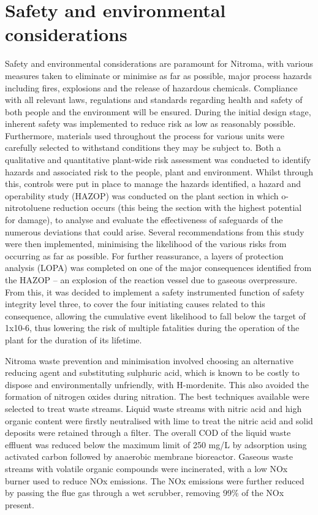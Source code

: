 \section*{Safety and environmental considerations}

Safety and environmental considerations are paramount for Nitroma, with various measures taken to eliminate or minimise as far as possible, major process hazards including fires, explosions and the release of hazardous chemicals. Compliance with all relevant laws, regulations and standards regarding health and safety of both people and the environment will be ensured.  During the initial design stage, inherent safety was implemented to reduce risk as low as reasonably possible. Furthermore, materials used throughout the process for various units were carefully selected to withstand conditions they may be subject to. Both a qualitative and quantitative plant-wide risk assessment was conducted to identify hazards and associated risk to the people, plant and environment. Whilst through this, controls were put in place to manage the hazards identified, a hazard and operability study (HAZOP) was conducted on the plant section in which o-nitrotoluene reduction occurs (this being the section with the highest potential for damage), to analyse and evaluate the effectiveness of safeguards of the numerous deviations that could arise. Several recommendations from this study were then implemented, minimising the likelihood of the various risks from occurring as far as possible. For further reassurance, a layers of protection analysis (LOPA) was completed on one of the major consequences identified from the HAZOP – an explosion of the reaction vessel due to gaseous overpressure.  From this, it was decided to implement a safety instrumented function of safety integrity level three, to cover the four initiating causes related to this consequence, allowing the cumulative event likelihood to fall below the target of 1x10-6, thus lowering the risk of multiple fatalities during the operation of the plant for the duration of its lifetime. 

Nitroma waste prevention and minimisation involved choosing an alternative reducing agent and substituting sulphuric acid, which is known to be costly to dispose and environmentally unfriendly, with H-mordenite. This also avoided the formation of nitrogen oxides during nitration. The best techniques available were selected to treat waste streams. Liquid waste streams with nitric acid and high organic content were firstly neutralised with lime to treat the nitric acid and solid deposits were retained through a filter. The overall COD of the liquid waste effluent was reduced below the maximum limit of 250 mg/L by adsorption using activated carbon followed by anaerobic membrane bioreactor. Gaseous waste streams with volatile organic compounds were incinerated, with a low NOx burner used to reduce NOx emissions. The NOx emissions were further reduced by passing the flue gas through a wet scrubber, removing 99\% of the NOx present. 


